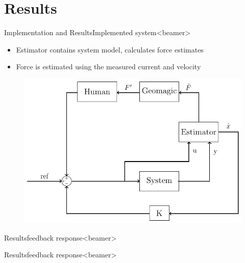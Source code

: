 \section{Results}

\begin{frame}{Implementation and Results}{Implemented system}<beamer>
%
	\begin{itemize}
		\item Estimator contains system model, calculates force estimates
		\item Force is estimated using the measured current and velocity
	\end{itemize}
	\begin{figure}
		\centering
		\includegraphics[scale=0.7]{Billeder/kalman_control}
	\end{figure}
\end{frame}

\begin{frame}{Results}{feedback response}<beamer>

\begin{figure}
\centering

\end{figure}
\end{frame}

\begin{frame}{Results}{feedback response}<beamer>

\begin{figure}
\centering

\end{figure}
\end{frame}

